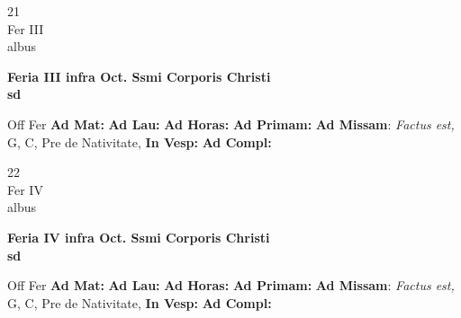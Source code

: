 \documentclass[10pt, openany]{book}
\begin{document}
    \begin{center}
        \begin{minipage}{3.5in}
            \vspace{2em}
            \begin{minipage}{0.5in}
                {\Huge 21} \\
                {\normalsize Fer III} \\
                {\normalsize albus}
            \end{minipage}
            \begin{minipage}{3.0in}
                \textbf{ \large Feria III infra Oct. Ssmi Corporis Christi \\
                \textnormal{\normalsize sd}} \\ 
            \end{minipage}
            \begin{justify}Off Fer
                \textbf{Ad Mat: }
                \textbf{Ad Lau: }
                \textbf{Ad Horas: }
                \textbf{Ad Primam: }\textbf{Ad Missam}: \textit{Factus est,} G, C, Pre de Nativitate,  
                \textbf{In Vesp: }
                \textbf{Ad Compl: }
            \end{justify}
        \end{minipage}
    \end{center}

    \begin{center}
        \begin{minipage}{3.5in}
            \vspace{2em}
            \begin{minipage}{0.5in}
                {\Huge 22} \\
                {\normalsize Fer IV} \\
                {\normalsize albus}
            \end{minipage}
            \begin{minipage}{3.0in}
                \textbf{ \large Feria IV infra Oct. Ssmi Corporis Christi \\
                \textnormal{\normalsize sd}} \\ 
            \end{minipage}
            \begin{justify}Off Fer
                \textbf{Ad Mat: }
                \textbf{Ad Lau: }
                \textbf{Ad Horas: }
                \textbf{Ad Primam: }\textbf{Ad Missam}: \textit{Factus est,} G, C, Pre de Nativitate,  
                \textbf{In Vesp: }
                \textbf{Ad Compl: }
            \end{justify}
        \end{minipage}
    \end{center}
\end{document}
